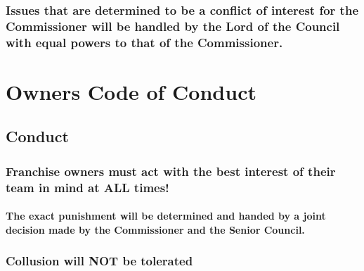 \documentclass[]{book}
\begin{document}
\hypertarget{issues-that-are-determined-to-be-a-conflict-of-interest-for-the-commissioner-will-be-handled-by-the-lord-of-the-council-with-equal-powers-to-that-of-the-commissioner.}{%
\subsection{Issues that are determined to be a conflict of interest for the Commissioner will be handled by the Lord of the Council with equal powers to that of the Commissioner.}\label{issues-that-are-determined-to-be-a-conflict-of-interest-for-the-commissioner-will-be-handled-by-the-lord-of-the-council-with-equal-powers-to-that-of-the-commissioner.}}

\hypertarget{code-of-conduct}{%
\chapter{Owners Code of Conduct}\label{code-of-conduct}}

\hypertarget{conduct}{%
\section{Conduct}\label{conduct}}

\hypertarget{franchise-owners-must-act-with-the-best-interest-of-their-team-in-mind-at-all-times}{%
\subsection{Franchise owners must act with the best interest of their team in mind at ALL times!}\label{franchise-owners-must-act-with-the-best-interest-of-their-team-in-mind-at-all-times}}

\hypertarget{the-exact-punishment-will-be-determined-and-handed-by-a-joint-decision-made-by-the-commissioner-and-the-senior-council.}{%
\subsubsection{The exact punishment will be determined and handed by a joint decision made by the Commissioner and the Senior Council.}\label{the-exact-punishment-will-be-determined-and-handed-by-a-joint-decision-made-by-the-commissioner-and-the-senior-council.}}

\hypertarget{collusion-will-not-be-tolerated}{%
\subsection{\texorpdfstring{Collusion will \textbf{NOT} be tolerated}{Collusion will NOT be tolerated}}\label{collusion-will-not-be-tolerated}}
\end{document}
